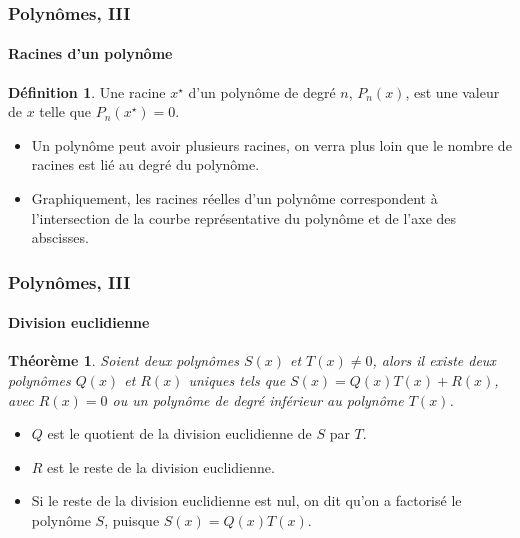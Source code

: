 \documentclass[10pt,notheorems]{beamer}
\theoremstyle{plain}
\newtheorem{theorem}{Théorème}
\theoremstyle{definition} %
\newtheorem{definition}{Définition}
\begin{document}
\begin{frame}
  \frametitle{Polynômes, III}
  \framesubtitle{Racines d'un polynôme}
  \hypertarget{slide_polynome_racines_1}{}

  \bigskip

  \begin{definition}
    Une racine $x^{\star}$ d'un polynôme de degré $n$, $P_n(x)$, est une
    valeur de $x$ telle que $P_n(x^{\star})=0$.
  \end{definition}

  \bigskip

  \begin{itemize}

  \item Un polynôme peut avoir plusieurs racines, on verra plus loin que le nombre de racines est lié au degré du polynôme.\newline

  \item Graphiquement, les racines réelles d'un polynôme correspondent à l'intersection de la courbe représentative du polynôme et de l'axe des abscisses.

  \end{itemize}

\end{frame}


\begin{frame}
  \frametitle{Polynômes, III}
  \framesubtitle{Division euclidienne}
  \hypertarget{slide_division_1}{}

  \bigskip

  \begin{theorem}
    Soient deux polynômes $S(x)$ et $T(x)\neq 0$, alors il existe deux polynômes $Q(x)$ et $R(x)$ uniques tels que $S(x) = Q(x)T(x)+R(x)$, avec $R(x)=0$ ou un polynôme de degré inférieur au polynôme $T(x)$.
  \end{theorem}

  \bigskip

  \begin{itemize}

  \item $Q$ est le quotient de la division euclidienne de $S$ par $T$.\newline

  \item $R$ est le reste de la division euclidienne.\newline

  \item Si le reste de la division euclidienne est nul, on dit qu'on a factorisé le polynôme $S$, puisque $S(x)=Q(x)T(x)$.

  \end{itemize}

\end{frame}
\end{document}
